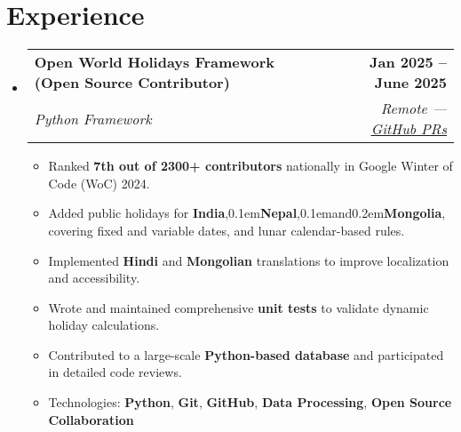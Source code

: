 \documentclass[letterpaper,11pt]{article}
\makeatletter
\newcommand{\resumeItem}[1]{
  \item\small{
    {#1 \vspace{-2pt}}
  }
}
\newcommand{\resumeSubheading}[4]{
  \vspace{-2pt}\item
    \begin{tabular*}{1.0\textwidth}[t]{l@{\extracolsep{\fill}}r}
      \vspace{-2pt}\textbf{#1} & \textbf{\small #2} \\
      \textit{\small#3} & \textit{\small #4} \\
    \end{tabular*}\vspace{-7pt}
}
\newcommand{\resumeSubHeadingListStart}{\begin{itemize}[leftmargin=0.0in, label={}]}
\newcommand{\resumeSubHeadingListEnd}{\end{itemize}}
\newcommand{\resumeItemListStart}{\begin{itemize}}
\newcommand{\resumeItemListEnd}{\end{itemize}\vspace{-5pt}}
\makeatother
\begin{document}
\section{Experience}
    \resumeSubHeadingListStart
        \resumeSubheading
        {Open World Holidays Framework (Open Source Contributor)}{Jan 2025 -- June 2025}
        {Python Framework}{Remote — \href{https://github.com/vacanza/holidays/pulls/ankushhKapoor}{\underline{GitHub PRs}}}
        \resumeItemListStart
            \resumeItem{Ranked \textbf{7th out of 2300+ contributors} nationally in Google Winter of Code (WoC) 2024.}
            \resumeItem{Added public holidays for \textbf{India},\kern0.1em\textbf{Nepal},\kern0.1emand\kern0.2em\textbf{Mongolia}, covering fixed and variable dates, and lunar calendar-based rules.}
            \resumeItem{Implemented \textbf{Hindi} and \textbf{Mongolian} translations to improve localization and accessibility.}
            \resumeItem{Wrote and maintained comprehensive \textbf{unit tests} to validate dynamic holiday calculations.}
            \resumeItem{Contributed to a large-scale \textbf{Python-based database} and participated in detailed code reviews.}
            \resumeItem{Technologies: \textbf{Python}, \textbf{Git}, \textbf{GitHub}, \textbf{Data Processing}, \textbf{Open Source Collaboration}}
        \resumeItemListEnd
    \resumeSubHeadingListEnd
\vspace{-15pt}



\end{document}
